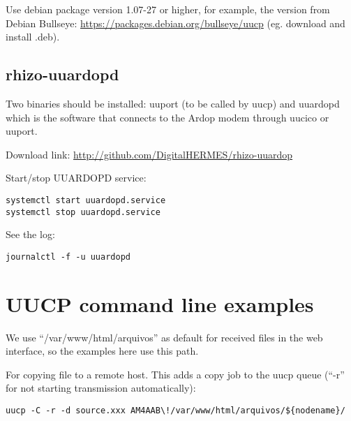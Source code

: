 \documentclass[11pt,a4paper]{article}
\begin{document}
Use debian package version 1.07-27 or higher, for example, the version
from Debian Bullseye: \url{https://packages.debian.org/bullseye/uucp}
(eg. download and install .deb).

\subsection{rhizo-uuardopd}


Two binaries should be installed: uuport (to be called by uucp) and uuardopd
which is the software that connects to the Ardop modem through uucico or uuport.

Download link: \url{http://github.com/DigitalHERMES/rhizo-uuardop}

Start/stop UUARDOPD service:
\begin{verbatim}
systemctl start uuardopd.service
systemctl stop uuardopd.service
\end{verbatim}


See the log:
\begin{verbatim}
journalctl -f -u uuardopd
\end{verbatim}




\section{UUCP command line examples}

We use ``/var/www/html/arquivos'' as default for received
files in the web interface, so the examples here use this path.

For copying file to a remote host. This adds a copy job to the uucp queue (``-r'' for not starting transmission
automatically):
\begin{verbatim}
uucp -C -r -d source.xxx AM4AAB\!/var/www/html/arquivos/${nodename}/
\end{verbatim}
\end{document}
